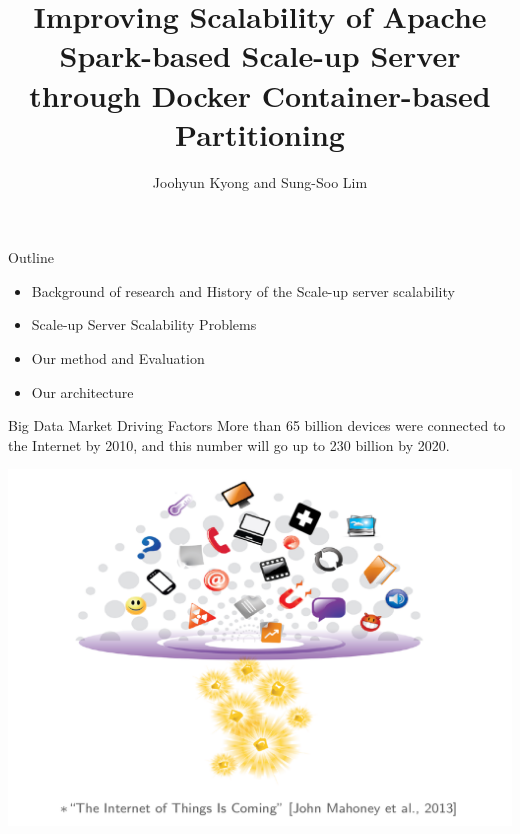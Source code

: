 \documentclass[english]{beamer} %
\begin{document}
\title[Memory Scalability]{
Improving Scalability of Apache Spark-based Scale-up Server
through Docker Container-based Partitioning
}

\author{Joohyun Kyong and Sung-Soo Lim}


\begin{frame}
  \titlepage
\end{frame}

\begin{frame}{Outline}
	\begin{itemize}
	\item Background of research and History of the Scale-up server scalability 
	\item Scale-up Server Scalability Problems
	\item Our method and Evaluation
	\item Our architecture
	\end{itemize}
\end{frame}


\begin{frame}{Big Data Market Driving Factors}
More than 65 billion devices were connected to the Internet by
2010, and this number will go up to 230 billion by 2020.

\begin{center}
\includegraphics[scale=0.3]{fig/bigdata}
\end{center}

\end{frame}
\end{document}
